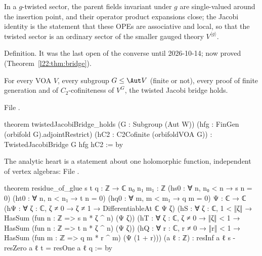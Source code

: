 \begin{physics}
In a $g$-twisted sector, the parent fields invariant under $g$ are single-valued around the insertion point, and their
operator product expansions close; the Jacobi identity is the statement that these OPEs are associative and local, so
that the twisted sector is an ordinary sector of the smaller gauged theory $V^{\langle g\rangle}$.
\end{physics}

\begin{status}
Definition. It was the last open  of the converse until 2026-10-14; now proved (Theorem~\ref{l22:thm:bridge}).
\end{status}

\begin{theorem}\label{l22:thm:bridge}
For every VOA $V$, every subgroup $G\le\Aut V$ (finite or not), every proof of finite generation and of
$C_2$-cofiniteness of $V^G$, the twisted Jacobi bridge holds.
\end{theorem}
\noindent File .
\begin{leancode}
theorem twistedJacobiBridge_holds (G : Subgroup (Aut W)) (hfg : FinGen (orbifold G).adjointRestrict)
    (hC2 : C2Cofinite (orbifoldVOA G)) : TwistedJacobiBridge G hfg hC2 := by
\end{leancode}
The analytic heart is a statement about one holomorphic function, independent of vertex algebras:
\noindent File .
\begin{leancode}
theorem residue_of_glue {s t q : ℤ → ℂ} {n₀ n₁ m₁ : ℤ}
    (hs0 : ∀ n, n₀ < n → s n = 0) (ht0 : ∀ n, n < n₁ → t n = 0) (hq0 : ∀ m, m < m₁ → q m = 0)
    {Ψ : ℂ → ℂ} (hΨ : ∀ ζ : ℂ, ζ ≠ 0 → ζ ≠ 1 → DifferentiableAt ℂ Ψ ζ)
    (hS : ∀ ζ : ℂ, 1 < ‖ζ‖ → HasSum (fun n : ℤ => s n * ζ ^ n) (Ψ ζ))
    (hT : ∀ ζ : ℂ, ζ ≠ 0 → ‖ζ‖ < 1 → HasSum (fun n : ℤ => t n * ζ ^ n) (Ψ ζ))
    (hQ : ∀ r : ℂ, r ≠ 0 → ‖r‖ < 1 → HasSum (fun m : ℤ => q m * r ^ m) (Ψ (1 + r)))
    (a ℓ : ℤ) : resInf a ℓ s - resZero a ℓ t = resOne a ℓ q := by
\end{leancode}

